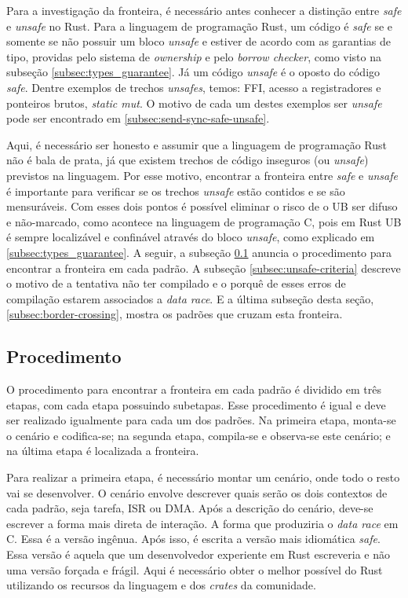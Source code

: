 Para a investigação da fronteira, é necessário antes conhecer a distinção entre \textit{safe} e \textit{unsafe} no Rust. Para a linguagem de programação Rust, um código é \textit{safe} se e somente se não possuir um bloco \textit{unsafe} e estiver de acordo com as garantias de tipo, providas pelo sistema de \textit{ownership} e pelo \textit{borrow checker}, como visto na subseção \ref{subsec:types_guarantee}. Já um código \textit{unsafe} é o oposto do código \textit{safe}. Dentre exemplos de trechos \textit{unsafes}, temos: \ac{FFI}, acesso a registradores e ponteiros brutos, \textit{static mut}. O motivo de cada um destes exemplos ser \textit{unsafe} pode ser encontrado em \ref{subsec:send-sync-safe-unsafe}.

Aqui, é necessário ser honesto e assumir que a linguagem de programação Rust não é bala de prata, já que existem trechos de código inseguros (ou \textit{unsafe}) previstos na linguagem. Por esse motivo, encontrar a fronteira entre \textit{safe} e \textit{unsafe} é importante para verificar se os trechos \textit{unsafe} estão contidos e se são mensuráveis. Com esses dois pontos é possível eliminar o risco de o \ac{UB} ser difuso e não-marcado, como acontece na linguagem de programação C, pois em Rust \ac{UB} é sempre localizável e confinável através do bloco \textit{unsafe}, como explicado em \ref{subsec:types_guarantee}. A seguir, a subseção \ref{subsec:border-procedure} anuncia o procedimento para encontrar a fronteira em cada padrão. A subseção \ref{subsec:unsafe-criteria} descreve o motivo de a tentativa não ter compilado e o porquê de esses erros de compilação estarem associados a \textit{data race}. E a última subseção desta seção, \ref{subsec:border-crossing}, mostra os padrões que cruzam esta fronteira.

\subsection{Procedimento}
\label{subsec:border-procedure}

O procedimento para encontrar a fronteira em cada padrão é dividido em três etapas, com cada etapa possuindo subetapas. Esse procedimento é igual e deve ser realizado igualmente para cada um dos padrões. Na primeira etapa, monta-se o cenário e codifica-se; na segunda etapa, compila-se e observa-se este cenário; e na última etapa é localizada a fronteira.

Para realizar a primeira etapa, é necessário montar um cenário, onde todo o resto vai se desenvolver. O cenário envolve descrever quais serão os dois contextos de cada padrão, seja tarefa, \ac{ISR} ou \ac{DMA}. Após a descrição do cenário, deve-se escrever a forma mais direta de interação. A forma que produziria o \textit{data race} em C. Essa é a versão ingênua. Após isso, é escrita a versão mais idiomática \textit{safe}. Essa versão é aquela que um desenvolvedor experiente em Rust escreveria e não uma versão forçada e frágil. Aqui é necessário obter o melhor possível do Rust utilizando os recursos da linguagem e dos \textit{crates} da comunidade.


